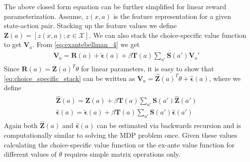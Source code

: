 \documentclass{article}
\begin{document}
The above closed form equation can be further simplified for linear reward parameterization. Assume, $z(x, a)$ is the feature representation for a given state-action pair. Stacking up the feature values we define $\mathbf{Z}(a) = [z(x, a); x \in \mathcal{X}]$. We can also stack the choice-specific value function to get $\mathbf{V}_a$. From \eqref{eq:exantebellman_4} we get
\begin{align} \label{eq:choice_specific_stack}
    \begin{split}
    \mathbf{V}_a=\mathbf{R}(a)+\tilde{\bm{\epsilon}}(a)+\beta \mathbf{T}(a) \sum_{a'}\mathbf{S}(a')\mathbf{V}_a'
    \end{split}
\end{align}
Since $\mathbf{R}(a) = \mathbf{Z}(a)^T\theta$ for linear parameters, it is easy to show that \eqref{eq:choice_specific_stack} can be written as $\mathbf{V}_a = \hat{\mathbf{Z}}(a)^T\theta + \hat{\bm{\epsilon}}(a)$, where we define
\begin{align}
\begin{split}
    \hat{\mathbf{Z}}(a) = \mathbf{Z}(a) + \beta\mathbf{T}(a)\sum_{a'}\mathbf{S}(a')\hat{\mathbf{Z}}(a') \\
    \hat{\bm{\epsilon}}(a) = \tilde{\bm{\epsilon}}(a) + \beta\mathbf{T}(a)\sum_{a'}\mathbf{S}(a')\hat{\bm{\epsilon}}(a')
\end{split}    
\end{align}
Again both $\hat{\mathbf{Z}}(a)$ and $\hat{\bm{\epsilon}}(a)$ can be estimated via backwards recursion and is computationally similar to solving the MDP problem once. Given these values calculating the choice-specific value function or the ex-ante value function for different values of $\theta$ requires simple matrix operations only.

\end{document}

